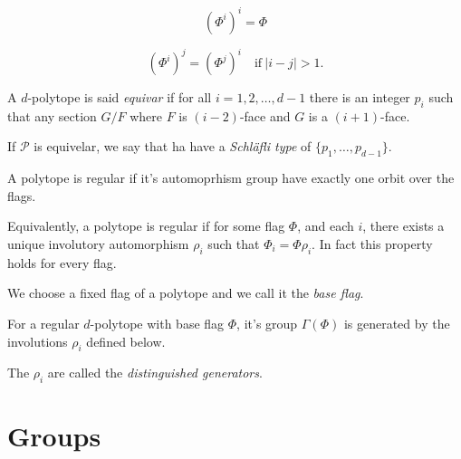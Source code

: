 \begin{property}
  \[
    \left(\Phi^i\right)^i = \Phi
  \]
\end{property}

\begin{property}
  \[
    \left(\Phi^i\right)^j = \left(\Phi^j\right)^i \quad \text{if} \ |i-j| > 1.
  \]
\end{property}

\begin{definition}
  A $d$-polytope is said \textit{equivar} if for all $i = 1, 2, \dots, d-1$ there is an integer $p_i$ such that any section $G/F$ where $F$ is $(i-2)$-face and $G$ is a $(i+1)$-face.
\end{definition}

\begin{definition}
  If $\mathcal P$ is equivelar, we say that ha have a \textit{Schläfli type} of $\{p_1, \dots, p_{d-1}\}$.
\end{definition}

\begin{definition}
  A polytope is regular if it's automoprhism group have exactly one orbit over the flags.
\end{definition}

\begin{property}
  Equivalently, a polytope is regular if for some flag $\Phi$, and each $i$, there exists a unique involutory automorphism $\rho_i$ such that $\Phi_i = \Phi \rho_i$. In fact this property holds for every flag.
\end{property}

\begin{definition}
  We choose a fixed flag of a polytope and we call it the \textit{base flag}.
\end{definition}

\begin{property}
  For a regular $d$-polytope with base flag $\Phi$, it's group $\Gamma(\Phi)$ is generated by the involutions $\rho_i$ defined below.
\end{property}

\begin{definition}
  The $\rho_i$ are called the \textit{distinguished generators}.
\end{definition}

\section{Groups}

